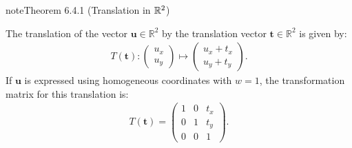 \documentclass[letterpaper,10pt,english]{jupyterBook}
\begin{document}
\begin{sphinxadmonition}{note}{Theorem 6.4.1 (Translation in \protect\(\mathbb{R}^2\protect\))}



\sphinxAtStartPar
The translation of the vector \(\mathbf{u} \in \mathbb{R}^2\) by the translation vector \(\mathbf{t} \in \mathbb{R}^2\) is given by:
\begin{equation*}
\begin{split} T(\mathbf{t}) :
\begin{pmatrix} u_x \\ u_y  \end{pmatrix} \mapsto
\begin{pmatrix} u_x + t_x \\ u_y + t_y  \end{pmatrix}. \end{split}
\end{equation*}
\sphinxAtStartPar
If \(\mathbf{u}\) is expressed using homogeneous co\sphinxhyphen{}ordinates with \(w=1\), the transformation matrix for this translation is:
\begin{equation}\label{equation:_pages/6.4_Translation:translation-matrix-equation}
\begin{split} T(\mathbf{t}) =
\begin{pmatrix}
    1 & 0 & t_x \\
    0 & 1 & t_y \\
    0 & 0 & 1
\end{pmatrix}. \end{split}
\end{equation}\end{sphinxadmonition}
\end{document}
